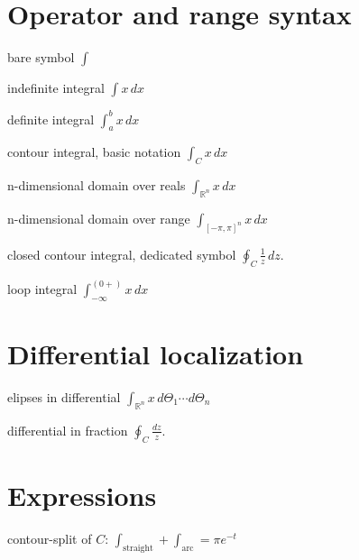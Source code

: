 \documentclass{article}
\begin{document}
\section{Operator and range syntax}

bare symbol
$\int$

indefinite integral
$ \int x\, dx$

definite integral
$ \int_a^b x\,dx$

contour integral, basic notation
$ \int_C x\, dx$

n-dimensional domain over reals
$\int_{\mathbb{R}^n} x\,dx$

n-dimensional domain over range
$\int_{[-\pi,\pi]^n} x\,dx$

closed contour integral, dedicated symbol
$\oint_C \frac{1}{z}\,dz.$

loop integral
$ \int_{-\infty}^{(0+)} x\,dx$

\section{Differential localization}

elipses in differential
$\int_{\mathbb{R}^n} x\,d\Theta_1 \cdots d\Theta_n$

differential in fraction
$\oint_C \frac{dz}{z}.$

\section{Expressions}

contour-split of $C$:
$\int_\mathrm{straight}+\int_\mathrm{arc}=\pi e^{-t}$
\end{document}
